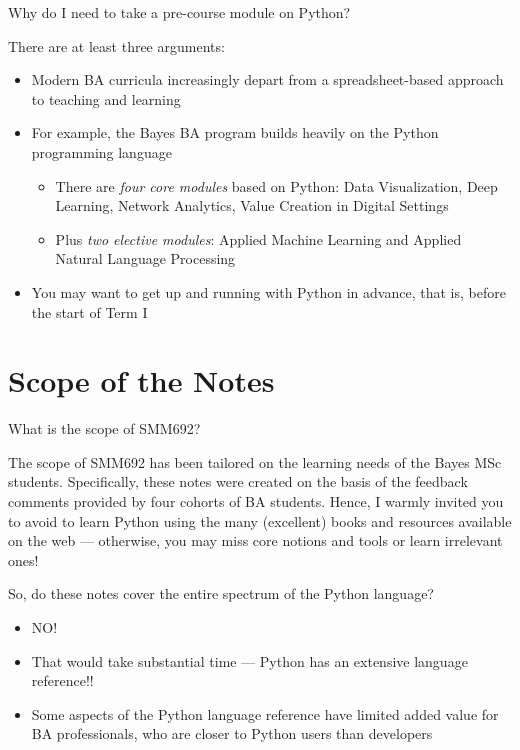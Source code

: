 \documentclass[a4paper,11pt]{book}
\numberwithin{figure}{chapter}
\numberwithin{table}{chapter}
\newcommand{\question}[1]{%
    \begin{tcolorbox}[colback=comp_c!10,colframe=comp_c,sidebyside align=top,width=\linewidth,before skip=1ex]
        #1
    \end{tcolorbox}
    \switchcolumn%
}
\newcommand{\note}[1]{%
    \begin{tcolorbox}[colback=white!0,colframe=white!10,width=\linewidth,before skip=1ex]
        #1
    \end{tcolorbox}
}
\begin{document}
\begin{paracol}{2}
	\question{\raggedright Why do I need to take a pre-course module on Python?}
        \note{
	There are at least three arguments:
	\begin{itemize}
		\item Modern BA curricula increasingly depart from a spreadsheet-based approach to teaching and learning
		\item For example, the Bayes BA program builds heavily on the Python programming language
		\begin{itemize}
			\item There are \emph{four core modules} based on Python: Data Visualization, Deep Learning, Network Analytics, Value Creation in Digital Settings
			\item Plus \emph{two elective modules}: Applied Machine Learning and Applied Natural Language Processing
		\end{itemize}
		\item You may want to get up and running with Python in advance, that is, before the start of Term I
	\end{itemize}
	}
\end{paracol}

\section{Scope of the Notes}

\begin{paracol}{2}
	\question{\raggedright What is the scope of SMM692?}
	\note{The scope of SMM692 has been tailored on the learning needs of the Bayes MSc students. Specifically, these notes were created on the basis of the feedback comments provided by four cohorts of BA students. Hence, I warmly invited you to avoid to learn Python using the many (excellent) books and resources available on the web --- otherwise, you may miss core notions and tools or learn irrelevant ones!
	}
\end{paracol}
\clearpage

\begin{paracol}{2}
	\question{\raggedright So, do these notes cover the entire spectrum of the Python language?}	
	\note{
	\begin{itemize}
		\item NO!
		\item That would take substantial time --- Python has an extensive language reference!!
		\item Some aspects of the Python language reference have limited added value for BA professionals, who are closer to Python users than developers
	\end{itemize}
	}
\end{paracol}
\end{document}
